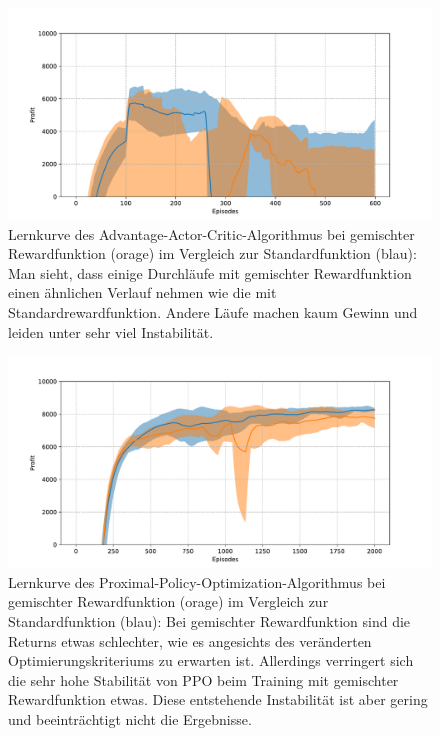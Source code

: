 \begin{figure}[htbp]
	\centering
	\includegraphics[width=\textwidth]{appendix/mixed_rewards_a2c.pdf}
	\caption{
		Lernkurve des Advantage-Actor-Critic-Algorithmus bei gemischter Rewardfunktion (orage) im Vergleich zur Standardfunktion (blau):
		Man sieht, dass einige Durchläufe mit gemischter Rewardfunktion einen ähnlichen Verlauf nehmen wie die mit Standardrewardfunktion.
		Andere Läufe machen kaum Gewinn und leiden unter sehr viel Instabilität.
	}
	\label{graphic:MixedRewardsA2C}
\end{figure}
\begin{figure}[htbp]
	\centering
	\includegraphics[width=\textwidth]{appendix/mixed_rewards_ppo.pdf}
	\caption{
		Lernkurve des Proximal-Policy-Optimization-Algorithmus bei gemischter Rewardfunktion (orage) im Vergleich zur Standardfunktion (blau):
		Bei gemischter Rewardfunktion sind die Returns etwas schlechter, wie es angesichts des veränderten Optimierungskriteriums zu erwarten ist.
		Allerdings verringert sich die sehr hohe Stabilität von PPO beim Training mit gemischter Rewardfunktion etwas.
		Diese entstehende Instabilität ist aber gering und beeinträchtigt nicht die Ergebnisse.
	}
	\label{graphic:MixedRewardsPPO}
\end{figure}
